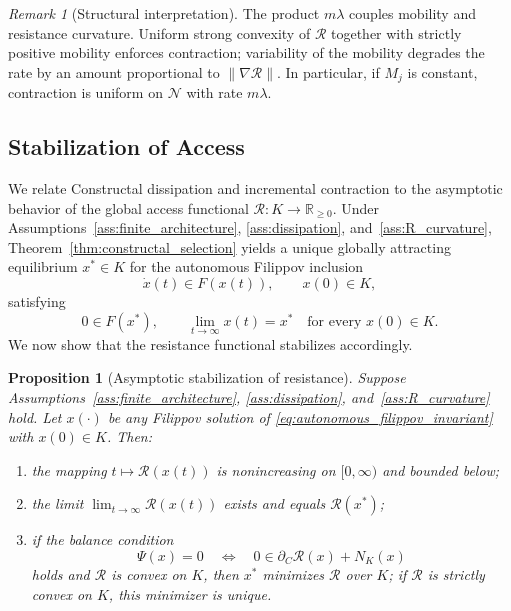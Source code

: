 \documentclass[12pt]{article}
\theoremstyle{plain}
\newtheorem{proposition}[theorem]{Proposition}
\theoremstyle{definition}
\theoremstyle{remark}
\newtheorem{remark}[theorem]{Remark}
\begin{document}
\begin{remark}[Structural interpretation]
\label{rem:structural_interpretation_contraction}
The product $m\lambda$ couples mobility and resistance curvature.
Uniform strong convexity of $\mathcal R$ together with strictly positive
mobility enforces contraction; variability of the mobility degrades the
rate by an amount proportional to $\|\nabla\mathcal R\|$.
In particular, if $M_j$ is constant, contraction is uniform on
$\mathcal N$ with rate $m\lambda$.
\end{remark}

\subsection{Stabilization of Access}
\label{subsec:stabilization_access}

We relate Constructal dissipation and incremental contraction to the
asymptotic behavior of the global access functional
$\mathcal R:K\to\mathbb R_{\ge0}$.
Under Assumptions~\ref{ass:finite_architecture},
\ref{ass:dissipation}, and~\ref{ass:R_curvature},
Theorem~\ref{thm:constructal_selection} yields a unique globally attracting
equilibrium $x^\ast\in K$ for the autonomous Filippov inclusion
\begin{equation}
\dot x(t)\in F(x(t)),\qquad x(0)\in K,
\label{eq:autonomous_filippov_invariant}
\end{equation}
satisfying
\[
0\in F(x^\ast),
\qquad
\lim_{t\to\infty}x(t)=x^\ast
\quad \text{for every } x(0)\in K .
\]
We now show that the resistance functional stabilizes accordingly.

\begin{proposition}[Asymptotic stabilization of resistance]
\label{prop:resistance_convergence}
Suppose Assumptions~\ref{ass:finite_architecture},
\ref{ass:dissipation}, and~\ref{ass:R_curvature} hold.
Let $x(\cdot)$ be any Filippov solution of
\eqref{eq:autonomous_filippov_invariant} with $x(0)\in K$.
Then:
\begin{enumerate}[label=(\roman*),leftmargin=2.2em]
\item the mapping $t\mapsto \mathcal R(x(t))$ is nonincreasing on $[0,\infty)$
      and bounded below;
\item the limit $\lim_{t\to\infty}\mathcal R(x(t))$ exists and equals $\mathcal R(x^\ast)$;
\item if the balance condition
      \begin{equation}
      \Psi(x)=0
      \quad \Longleftrightarrow \quad
      0\in \partial_C \mathcal R(x)+N_K(x)
      \label{eq:Psi_stationarity_equiv}
      \end{equation}
      holds and $\mathcal R$ is convex on $K$, then $x^\ast$ minimizes $\mathcal R$ over $K$;
      if $\mathcal R$ is strictly convex on $K$, this minimizer is unique.
\end{enumerate}
\end{proposition}
\end{document}
